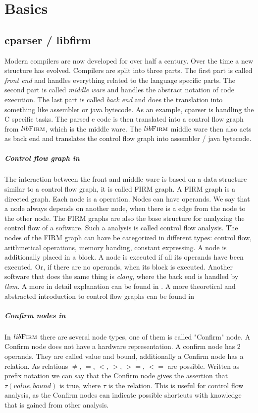\chapter{Basics}\label{sec:basics}

\section{cparser / libfirm}
Modern compilers are now developed for over half a century. Over the time a new structure has evolved. Compilers are split into three parts. The first part is called \textit{front end} and handles everything related to the language specific parts. The second part is called \textit{middle ware} and handles the abstract notation of code execution. The last part is called \textit{back end} and does the translation into something like assembler or java bytecode. As an example, cparser is handling the C specific tasks. The parsed c code is then translated into a control flow graph from $lib\textsc{Firm}$, which is the middle ware. The $lib\textsc{Firm}$ middle ware then also acts as back end and translates the control flow graph into assembler / java bytecode.

\paragraph{Control flow graph in \libFIRM} The interaction between the front and middle ware is based on a data structure similar to a control flow graph, it is called FIRM graph. A FIRM graph is a directed graph. Each node is a operation. Nodes can have operands. We say that a node always depends on another node, when there is a edge from the node to the other node. The FIRM graphs are also the base structure for analyzing the control flow of a software. Such a analysis is called control flow analysis. The nodes of the FIRM graph can have be categorized in different types: control flow, arithmetical operations, memory handing, constant expressing. A node is additionally placed in a block. A node is executed if all its operands have been executed. Or, if there are no operands, when its block is executed.
Another software that does the same thing is \textit{clang}, where the back end is handled by \textit{llvm}.
A more in detail explanation can be found in \cite{libfirm}. A more theoretical and abstracted introduction to control flow graphs can be found in \cite{control-flow-analysis}

\paragraph{Confirm nodes in \libFIRM}
In $lib\textsc{Firm}$ there are several node types, one of them is called "Confirm" node. A Confirm node does not have a hardware representation. A confirm node has 2 operands. They are called value and bound, additionally a Confirm node has a relation. As relations $\not=$, $=$, $<$, $>$, $>=$, $<=$ are possible. 
Written as prefix notation we can say that the Confirm node gives the assertion that $\tau(value, bound)$ is true, where $\tau$ is the relation. This is useful for control flow analysis, as the Confirm nodes can indicate possible shortcuts with knowledge that is gained from other analysis.


